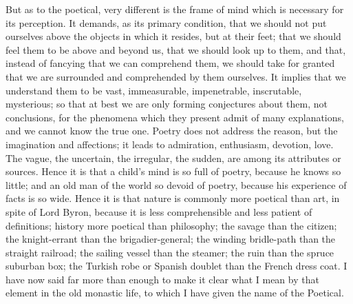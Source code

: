 But as to the poetical, very different is the frame of mind which is
necessary for its perception. It demands, as its primary condition,
that we should not put ourselves above the objects in which it
resides, but at their feet; that we should feel them to be above and
beyond us, that we should look up to them, and that, instead of
fancying that we can comprehend them, we should take for granted that
we are surrounded and comprehended by them ourselves. It implies that
we understand them to be vast, immeasurable, impenetrable,
inscrutable, mysterious; so that at best we are only forming
conjectures about them, not conclusions, for the phenomena which they
present admit of many explanations, and we cannot know the true one.
Poetry does not address the reason, but the imagination and
affections; it leads to admiration, enthusiasm, devotion, love. The
vague, the uncertain, the irregular, the sudden, are among its
attributes or sources. Hence it is that a child's mind is so full of
poetry, because he knows so little; and an old man of the world so
devoid of poetry, because his experience of facts is so wide. Hence it
is that nature is commonly more poetical than art, in spite of Lord
Byron, because it is less comprehensible and less patient of
definitions; history more poetical than philosophy; the savage than
the citizen; the knight-errant than the brigadier-general; the winding
bridle-path than the straight railroad; the sailing vessel than
the steamer; the ruin than the spruce suburban box; the Turkish robe
or Spanish doublet than the French dress coat. I have now said far
more than enough to make it clear what I mean by that element in the
old monastic life, to which I have given the name of the Poetical.

